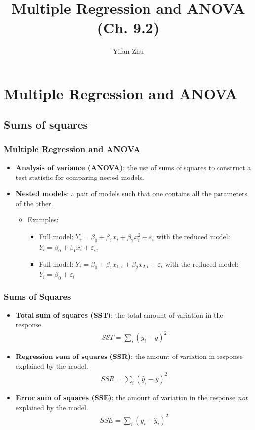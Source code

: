 \documentclass[handout]{beamer}\usepackage[]{graphicx}\usepackage[]{color}
\title{Multiple Regression and ANOVA (Ch. 9.2)}
\author{Yifan Zhu}
\date{}
\institute{Iowa State University}
\providecommand{\e}{\varepsilon}
\providecommand{\ov}[1]{\overline{#1}}
\providecommand{\wh}[1]{\widehat{#1}}
\numberwithin{equation}{section}
\begin{document}
\begin{frame}
\titlepage
 \end{frame}
 

\section{Multiple Regression and ANOVA}

\subsection{Sums of squares}

\begin{frame}
\frametitle{Multiple Regression and ANOVA}
\begin{itemize}
\item {\bf Analysis of variance (ANOVA)}: the use of sums of squares to construct a test statistic for comparing nested models.
\pause \item {\bf Nested models}: a pair of models such that one contains all the parameters of the other.
\begin{itemize}
\pause \item Examples:
\begin{itemize}
\pause \item Full model: $Y_i = \beta_0 + \beta_1 x_i + \beta_2 x_i^2 + \e_i$ with the reduced model: $Y_i = \beta_0 + \beta_1 x_i + \e_i$.
\pause \item Full model: $Y_i = \beta_0 + \beta_1 x_{1, i} + \beta_2 x_{2, i} + \e_i$ with the reduced model: $Y_i = \beta_0 + \e_i$
\end{itemize}
\end{itemize}
\end{itemize}
\end{frame}


\begin{frame}
\frametitle{Sums of Squares}
\begin{itemize}
\item {\bf Total sum of squares (SST)}: the total amount of variation in the response.
\begin{align*}
SST = \sum_i (y_i - \ov{y})^2
\end{align*}
\pause \item {\bf Regression sum of squares (SSR)}: the amount of variation in response explained by the model.
\begin{align*}
SSR = \sum_i (\wh{y}_i - \ov{y})^2
\end{align*}
\pause \item {\bf Error sum of squares (SSE)}: the amount of variation in the response \emph{not} explained by the model.
\begin{align*}
SSE = \sum_i (y_i - \wh{y}_i)^2
\end{align*}
\end{itemize}
\end{frame}
\end{document}
